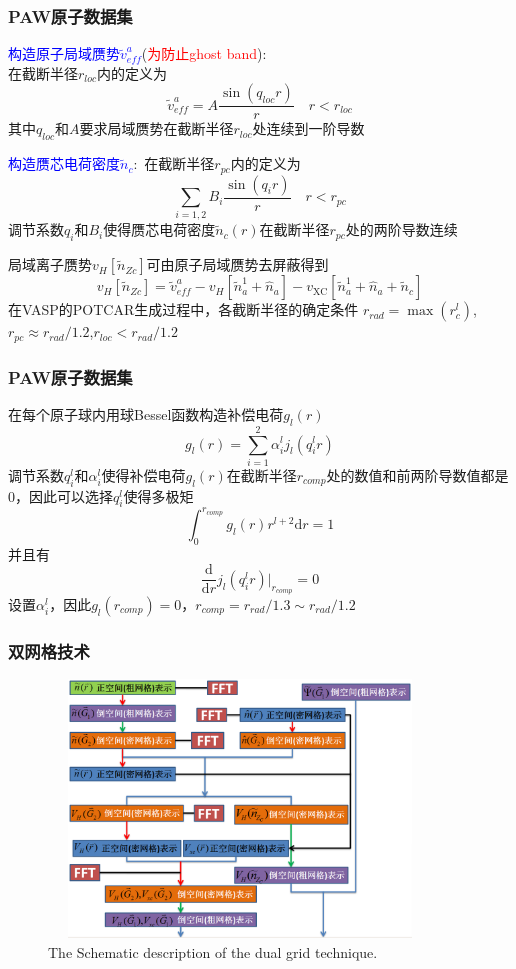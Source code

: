 \documentclass[cjk,slidestop,compress,mathserif,blue]{beamer}
\begin{document}
\frame
{
	\frametitle{\textrm{PAW}原子数据集}
	\textcolor{blue}{构造原子局域赝势$\tilde v_{e\!f\!f}^a$}(\textcolor{red}{为防止\textrm{ghost band}}):\\在截断半径$r_{loc}$内的定义为
	$$\tilde v_{e\!f\!f}^a=A\dfrac{\sin(q_{loc}r)}r\quad r<r_{loc}$$
	其中$q_{loc}$和$A$要求局域赝势在截断半径$r_{loc}$处连续到一阶导数

	\textcolor{blue}{构造赝芯电荷密度$\tilde n_c$}:~在截断半径$r_{pc}$内的定义为
	$$\sum_{i=1,2}B_i\dfrac{\sin(q_ir)}r\quad r<r_{pc}$$
	调节系数$q_i$和$B_i$使得赝芯电荷密度$\tilde n_c(r)$在截断半径$r_{pc}$处的两阶导数连续

	局域离子赝势$v_H[\tilde n_{Zc}]$可由原子局域赝势去屏蔽得到
	$$v_H[\tilde n_{Zc}]=\tilde v_{e\!f\!f}^a-v_H[\tilde n_a^1+\hat n_a]-v_{\mathrm{XC}}[\tilde n_a^1+\hat n_a+\tilde n_c]$$
	在\textrm{VASP}的\textrm{POTCAR}生成过程中，各截断半径的确定条件
	$r_{rad}=\max({r_c^l})$,$r_{pc}\approx r_{rad}/1.2$,$r_{loc}<r_{rad}/1.2$
}

\frame
{
	\frametitle{\textrm{PAW}原子数据集}
	在每个原子球内用球\textrm{Bessel}函数构造补偿电荷$g_l(r)$
	$$g_l(r)=\sum_{i=1}^2\alpha_i^lj_l(q_i^lr)$$
	调节系数$q_i^l$和$\alpha_i^l$使得补偿电荷$g_l(r)$在截断半径$r_{comp}$处的数值和前两阶导数值都是0，因此可以选择$q_i^l$使得多极矩
	$$\int_0^{r_{comp}}g_l(r)r^{l+2}\mathrm{d}r=1$$
	并且有
	$$\dfrac{\mathrm{d}}{\mathrm{d}r}j_l(q_i^lr)\bigg|_{r_{comp}}=0$$
	设置$\alpha_i^l$，因此$g_l(r_{comp})=0$，$r_{comp}=r_{rad}/1.3\sim r_{rad}/1.2$
}

\frame
{
	\frametitle{双网格技术}
\begin{figure}[h!]
	\vspace{-0.2in}
\centering
\includegraphics[height=2.7in,width=4.0in,viewport=0 0 800 600,clip]{Figures/dual_grid-2.png}
\caption{\tiny \textrm{The Schematic description of the dual grid technique.}}%
\label{PAW_dualgrid}
\end{figure} 
}
\end{document}
